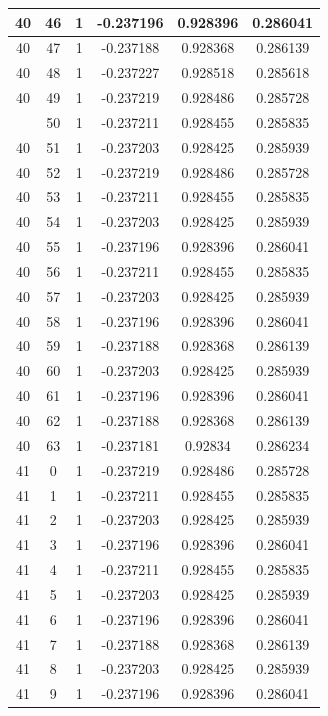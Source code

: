 \documentclass[12pt,a4paper]{article}
\numberwithin{equation}{section}
\numberwithin{figure}{section}
\numberwithin{table}{section}
\begin{document}
\begin{longtable}{|c|c|c|c|c|c|}
40 & 46 & 1 & -0.237196 & 0.928396 & 0.286041 \\ \hline
40 & 47 & 1 & -0.237188 & 0.928368 & 0.286139 \\ \hline
40 & 48 & 1 & -0.237227 & 0.928518 & 0.285618 \\ \hline
40 & 49 & 1 & -0.237219 & 0.928486 & 0.285728 \\ \hline
\pagebreak
40 & 50 & 1 & -0.237211 & 0.928455 & 0.285835 \\ \hline
40 & 51 & 1 & -0.237203 & 0.928425 & 0.285939 \\ \hline
40 & 52 & 1 & -0.237219 & 0.928486 & 0.285728 \\ \hline
40 & 53 & 1 & -0.237211 & 0.928455 & 0.285835 \\ \hline
40 & 54 & 1 & -0.237203 & 0.928425 & 0.285939 \\ \hline
40 & 55 & 1 & -0.237196 & 0.928396 & 0.286041 \\ \hline
40 & 56 & 1 & -0.237211 & 0.928455 & 0.285835 \\ \hline
40 & 57 & 1 & -0.237203 & 0.928425 & 0.285939 \\ \hline
40 & 58 & 1 & -0.237196 & 0.928396 & 0.286041 \\ \hline
40 & 59 & 1 & -0.237188 & 0.928368 & 0.286139 \\ \hline
40 & 60 & 1 & -0.237203 & 0.928425 & 0.285939 \\ \hline
40 & 61 & 1 & -0.237196 & 0.928396 & 0.286041 \\ \hline
40 & 62 & 1 & -0.237188 & 0.928368 & 0.286139 \\ \hline
40 & 63 & 1 & -0.237181 & 0.92834 & 0.286234 \\ \hline
41 & 0 & 1 & -0.237219 & 0.928486 & 0.285728 \\ \hline
41 & 1 & 1 & -0.237211 & 0.928455 & 0.285835 \\ \hline
41 & 2 & 1 & -0.237203 & 0.928425 & 0.285939 \\ \hline
41 & 3 & 1 & -0.237196 & 0.928396 & 0.286041 \\ \hline
41 & 4 & 1 & -0.237211 & 0.928455 & 0.285835 \\ \hline
41 & 5 & 1 & -0.237203 & 0.928425 & 0.285939 \\ \hline
41 & 6 & 1 & -0.237196 & 0.928396 & 0.286041 \\ \hline
41 & 7 & 1 & -0.237188 & 0.928368 & 0.286139 \\ \hline
41 & 8 & 1 & -0.237203 & 0.928425 & 0.285939 \\ \hline
41 & 9 & 1 & -0.237196 & 0.928396 & 0.286041 \\ \hline

\end{longtable}
\end{document}
